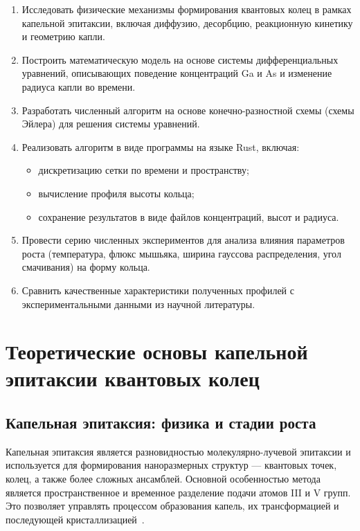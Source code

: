 \documentclass[14pt,oneside]{extarticle}
\begin{document}
\begin{enumerate}
  \item Исследовать физические механизмы формирования квантовых колец в рамках капельной эпитаксии, включая диффузию, десорбцию, реакционную кинетику и геометрию капли.
  \item Построить математическую модель на основе системы дифференциальных уравнений, описывающих поведение концентраций Ga и As и изменение радиуса капли во времени.
  \item Разработать численный алгоритм на основе конечно-разностной схемы (схемы Эйлера) для решения системы уравнений.
  \item Реализовать алгоритм в виде программы на языке Rust, включая:
  \begin{itemize}
    \item дискретизацию сетки по времени и пространству;
    \item вычисление профиля высоты кольца;
    \item сохранение результатов в виде файлов концентраций, высот и радиуса.
  \end{itemize}
  \item Провести серию численных экспериментов для анализа влияния параметров роста (температура, флюкс мышьяка, ширина гауссова распределения, угол смачивания) на форму кольца.
  \item Сравнить качественные характеристики полученных профилей с экспериментальными данными из научной литературы.
\end{enumerate}


\pagebreak
\section{Теоретические основы капельной эпитаксии квантовых колец}

\subsection{Капельная эпитаксия: физика и стадии роста}

Капельная эпитаксия является разновидностью молекулярно-лучевой эпитаксии и используется для формирования наноразмерных структур — квантовых точек, колец, а также более сложных ансамблей. Основной особенностью метода является пространственное и временное разделение подачи атомов III и V групп. Это позволяет управлять процессом образования капель, их трансформацией и последующей кристаллизацией~\cite{gurioli2021, koguchi1991}.
\end{document}
